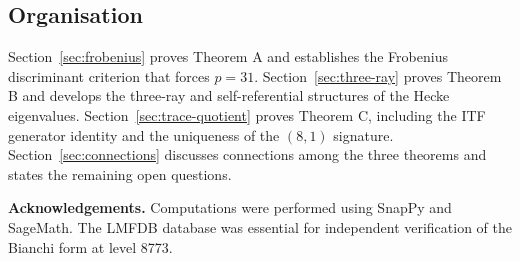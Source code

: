 \subsection{Organisation}

Section~\ref{sec:frobenius} proves Theorem A and establishes the
Frobenius discriminant criterion that forces $p = 31$.
Section~\ref{sec:three-ray} proves Theorem B and develops the
three-ray and self-referential structures of the Hecke eigenvalues.
Section~\ref{sec:trace-quotient} proves Theorem C, including the
ITF generator identity and the uniqueness of the $(8,1)$ signature.
Section~\ref{sec:connections} discusses connections among the three
theorems and states the remaining open questions.

\medskip
\noindent\textbf{Acknowledgements.}
Computations were performed using SnapPy \cite{snappy} and SageMath.
The LMFDB \cite{lmfdb} database was essential for independent verification
of the Bianchi form at level 8773.
